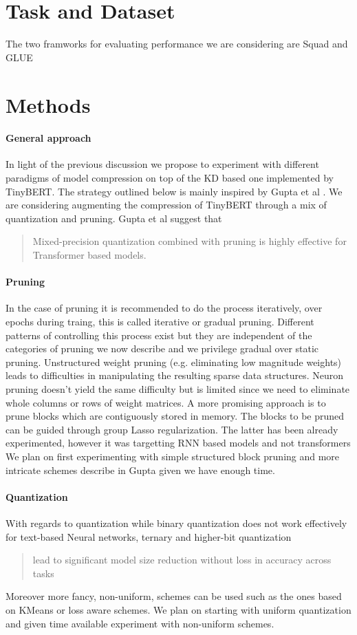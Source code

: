 \documentclass{article}
\begin{document}
\section{Task and Dataset}

The two framworks for evaluating performance we are considering are
Squad\cite{squad} and GLUE\cite{glue}


\section{Methods}

\paragraph{General approach}In light of the previous discussion we propose to
experiment with different paradigms of model compression on top of the KD based
one implemented by TinyBERT. The strategy outlined below is mainly inspired by
Gupta et al \cite{gupta2020compression}.  We are considering augmenting the
compression of TinyBERT through a mix of quantization and pruning.  Gupta et al
suggest that \blockcquote{gupta2020compression}{Mixed-precision quantization
combined with pruning is highly effective for Transformer based models.}

\paragraph{Pruning} In the case of pruning it is recommended to do the process
iteratively, over epochs during traing, this is called iterative or gradual
pruning. Different patterns of controlling this process exist but they are
independent of the categories of pruning we now describe and we privilege
gradual over static pruning. Unstructured weight pruning (e.g. eliminating low
magnitude weights) leads to difficulties in manipulating the resulting sparse
data structures.  Neuron pruning doesn't yield the same difficulty but is
limited since we need to eliminate whole columns or rows of weight matrices. A
more promising approach is to prune blocks which are contiguously stored in
memory. The blocks to be pruned can be guided through group Lasso
regularization. The latter has been already experimented, however it was
targetting RNN based models and not transformers\cite{blocksparse} We plan on
first experimenting with simple structured block pruning and more intricate
schemes describe in Gupta given we have enough time.

\paragraph{Quantization} With regards to quantization while binary quantization
does not work effectively for text-based Neural networks, ternary and higher-bit
quantization \blockcquote{gupta2020compression}{lead to significant model size
reduction without loss in accuracy across tasks}. Moreover more fancy,
non-uniform, schemes can be used such as the ones based on KMeans or loss aware
schemes.  We plan on starting with uniform quantization and given time available
experiment with non-uniform schemes.
\end{document}
